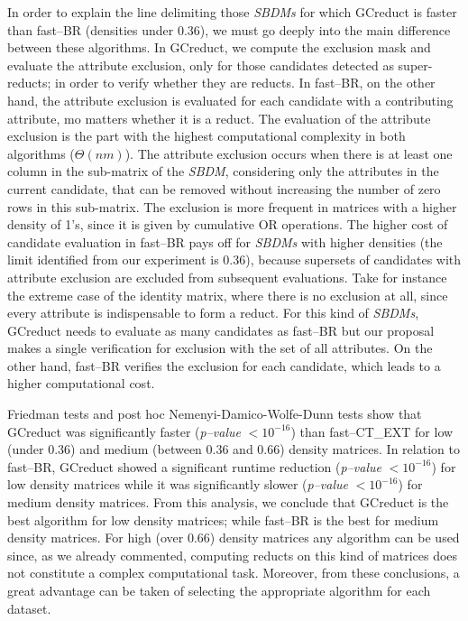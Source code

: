 \documentclass[authoryear,11pt]{elsarticle}
\begin{document}
  In order to explain the line delimiting those \textit{SBDMs} for which GCreduct is faster than fast--BR (densities under 0.36), we must go deeply into the main difference between these algorithms. In GCreduct, we compute the exclusion mask and evaluate the attribute exclusion, only for those candidates detected as super-reducts; in order to verify whether they are reducts. In fast--BR, on the other hand, the attribute exclusion is evaluated for each candidate with a contributing attribute, mo matters whether it is a reduct. The evaluation of the attribute exclusion is the part with the highest computational complexity in both algorithms ($\Theta (nm)$). The attribute exclusion occurs when there is at least one column in the sub-matrix of the \textit{SBDM}, considering only the attributes in the current candidate, that can be removed without increasing the number of zero rows in this sub-matrix. The exclusion is more frequent in matrices with a higher density of 1's, since it is given by cumulative OR operations. The higher cost of candidate evaluation in fast--BR pays off for \textit{SBDMs} with higher densities (the limit identified from our experiment is 0.36), because supersets of candidates with attribute exclusion are excluded from subsequent evaluations. Take for instance the extreme case of the identity matrix, where there is no exclusion at all, since every attribute is indispensable to form a reduct. For this kind of \textit{SBDMs}, GCreduct needs to evaluate as many candidates as fast--BR but our proposal makes a single verification for exclusion with the set of all attributes. On the other hand, fast--BR verifies the exclusion for each candidate, which leads to a higher computational cost.

  Friedman tests and post hoc Nemenyi-Damico-Wolfe-Dunn tests show that GCreduct was significantly faster (\textit{p--value} $< 10^{-16}$) than fast--CT\_EXT for low (under 0.36) and medium (between 0.36 and 0.66) density matrices. In relation to fast--BR, GCreduct showed a significant runtime reduction (\textit{p--value} $< 10^{-16}$) for low density matrices while it was significantly slower (\textit{p--value} $< 10^{-16}$) for medium density matrices. From this analysis, we conclude that GCreduct is the best algorithm for low density matrices; while fast--BR is the best for medium density matrices. For high (over 0.66) density matrices any algorithm can be used since, as we already commented, computing reducts on this kind of matrices does not constitute a complex computational task. Moreover, from these conclusions, a great advantage can be taken of selecting the appropriate algorithm for each dataset. 
\end{document}
